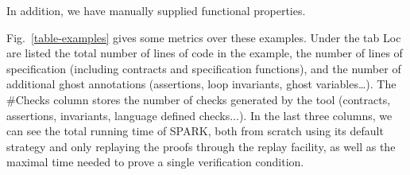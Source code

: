 \documentclass[runningheads]{llncs}
\begin{document}
%
In addition, we have manually supplied functional properties.

Fig.~\ref{table-examples} gives some metrics over these examples.
Under the tab Loc are listed the total number of lines of code in the example, the number of lines of specification (including contracts and specification functions), and the number of additional ghost annotations (assertions, loop invariants, ghost variables…). The \#Checks column stores the number of checks generated by the tool (contracts, assertions, invariants, language defined checks...). In the last three columns, we can see the total running time of SPARK, both from scratch using its default strategy and only replaying the proofs through the replay facility, as well as the maximal time needed to prove a single verification condition.
\end{document}
